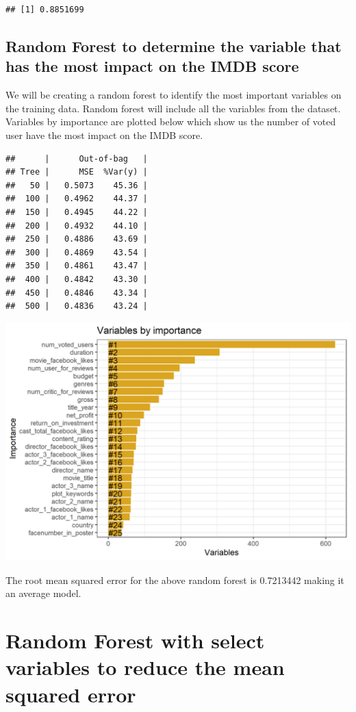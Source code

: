 \documentclass[
]{article}
\begin{document}
\begin{verbatim}
## [1] 0.8851699
\end{verbatim}

\hypertarget{random-forest-to-determine-the-variable-that-has-the-most-impact-on-the-imdb-score}{%
\subsection{Random Forest to determine the variable that has the most
impact on the IMDB
score}\label{random-forest-to-determine-the-variable-that-has-the-most-impact-on-the-imdb-score}}

We will be creating a random forest to identify the most important
variables on the training data. Random forest will include all the
variables from the dataset. Variables by importance are plotted below
which show us the number of voted user have the most impact on the IMDB
score.

\begin{verbatim}
##      |      Out-of-bag   |
## Tree |      MSE  %Var(y) |
##   50 |   0.5073    45.36 |
##  100 |   0.4962    44.37 |
##  150 |   0.4945    44.22 |
##  200 |   0.4932    44.10 |
##  250 |   0.4886    43.69 |
##  300 |   0.4869    43.54 |
##  350 |   0.4861    43.47 |
##  400 |   0.4842    43.30 |
##  450 |   0.4846    43.34 |
##  500 |   0.4836    43.24 |
\end{verbatim}

\includegraphics[width=0.75\linewidth]{IMDB_files/figure-latex/random forest-1}

The root mean squared error for the above random forest is 0.7213442
making it an average model.

\hypertarget{random-forest-with-select-variables-to-reduce-the-mean-squared-error}{%
\section{Random Forest with select variables to reduce the mean squared
error}\label{random-forest-with-select-variables-to-reduce-the-mean-squared-error}}
\end{document}
